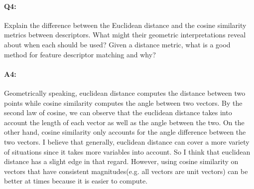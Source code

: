 

\pagebreak
\paragraph{Q4:} Explain the difference between the Euclidean distance and the cosine similarity metrics between descriptors. What might their geometric interpretations reveal about when each should be used? Given a distance metric, what is a good method for feature descriptor matching and why?

\paragraph{A4:}
Geometrically speaking, euclidean distance computes the distance between two points while cosine similarity computes the angle between two vectors. By the second law of cosine, we can observe that the euclidean distance takes into account the length of each vector as well as the angle between the two. On the other hand, cosine similarity only accounts for the angle difference between the two vectors. I believe that generally, euclidean distance can cover a more variety of situations since it takes more variables into account. So I think that euclidean distance has a slight edge in that regard. However, using cosine similarity on vectors that have consistent magnitudes(e.g. all vectors are unit vectors) can be better at times because it is easier to compute.




